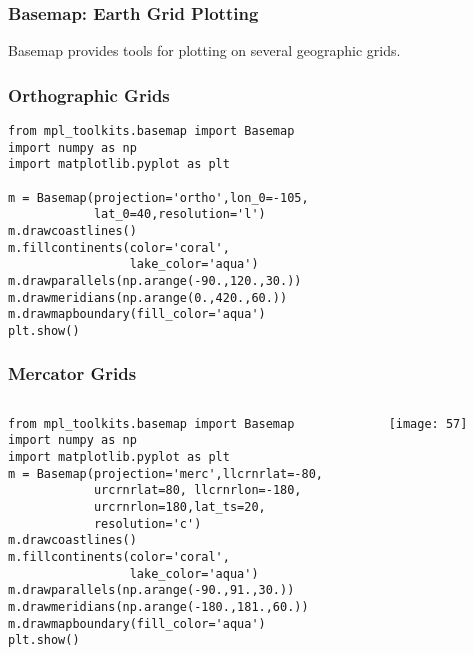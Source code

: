 \begin{frame}[fragile]\frametitle{Basemap: Earth Grid Plotting}

    Basemap provides tools for plotting on several geographic grids.
\end{frame}

\begin{frame}[fragile]\frametitle{Orthographic Grids}
    \begin{lstlisting}
from mpl_toolkits.basemap import Basemap
import numpy as np
import matplotlib.pyplot as plt

m = Basemap(projection='ortho',lon_0=-105,
            lat_0=40,resolution='l')
m.drawcoastlines()
m.fillcontinents(color='coral',
                 lake_color='aqua')
m.drawparallels(np.arange(-90.,120.,30.))
m.drawmeridians(np.arange(0.,420.,60.))
m.drawmapboundary(fill_color='aqua')
plt.show()
    \end{lstlisting}
\end{frame}

\begin{frame}[fragile]\frametitle{Mercator Grids}

\begin{columns}
    \begin{column}[T]{0.6\linewidth}
    \begin{lstlisting}
from mpl_toolkits.basemap import Basemap
import numpy as np
import matplotlib.pyplot as plt
m = Basemap(projection='merc',llcrnrlat=-80,
            urcrnrlat=80, llcrnrlon=-180,
            urcrnrlon=180,lat_ts=20,
            resolution='c')
m.drawcoastlines()
m.fillcontinents(color='coral',
                 lake_color='aqua')
m.drawparallels(np.arange(-90.,91.,30.))
m.drawmeridians(np.arange(-180.,181.,60.))
m.drawmapboundary(fill_color='aqua')
plt.show()
    \end{lstlisting}

    \end{column}
    \begin{column}[T]{0.4\linewidth}
\begin{center}
\texttt{[image: 57]}
\end{center}
    \end{column}
  \end{columns}
  
\end{frame}



